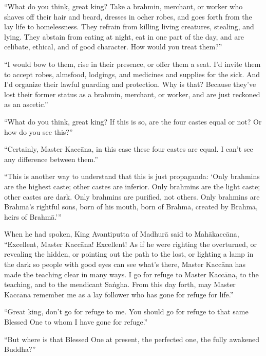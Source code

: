 \documentclass[12pt,openany]{book}%
\begin{document}
“What do you think, great king? Take a brahmin, merchant, or worker who shaves off their hair and beard, dresses in ocher robes, and goes forth from the lay life to homelessness. They refrain from killing living creatures, stealing, and lying. They abstain from eating at night, eat in one part of the day, and are celibate, ethical, and of good character. How would you treat them?” 

“I would bow to them, rise in their presence, or offer them a seat. I’d invite them to accept robes, almsfood, lodgings, and medicines and supplies for the sick. And I’d organize their lawful guarding and protection. Why is that? Because they’ve lost their former status as a brahmin, merchant, or worker, and are just reckoned as an ascetic.” 

“What do you think, great king? If this is so, are the four castes equal or not? Or how do you see this?” 

“Certainly, Master \textsanskrit{Kaccāna}, in this case these four castes are equal. I can’t see any difference between them.” 

“This is another way to understand that this is just propaganda: ‘Only brahmins are the highest caste; other castes are inferior. Only brahmins are the light caste; other castes are dark. Only brahmins are purified, not others. Only brahmins are \textsanskrit{Brahmā}’s rightful sons, born of his mouth, born of \textsanskrit{Brahmā}, created by \textsanskrit{Brahmā}, heirs of \textsanskrit{Brahmā}.’” 

When he had spoken, King Avantiputta of \textsanskrit{Madhurā} said to \textsanskrit{Mahākaccāna}, “Excellent, Master \textsanskrit{Kaccāna}! Excellent! As if he were righting the overturned, or revealing the hidden, or pointing out the path to the lost, or lighting a lamp in the dark so people with good eyes can see what’s there, Master \textsanskrit{Kaccāna} has made the teaching clear in many ways. I go for refuge to Master \textsanskrit{Kaccāna}, to the teaching, and to the mendicant \textsanskrit{Saṅgha}. From this day forth, may Master \textsanskrit{Kaccāna} remember me as a lay follower who has gone for refuge for life.” 

“Great king, don’t go for refuge to me. You should go for refuge to that same Blessed One to whom I have gone for refuge.” 

“But where is that Blessed One at present, the perfected one, the fully awakened Buddha?” 
\end{document}
